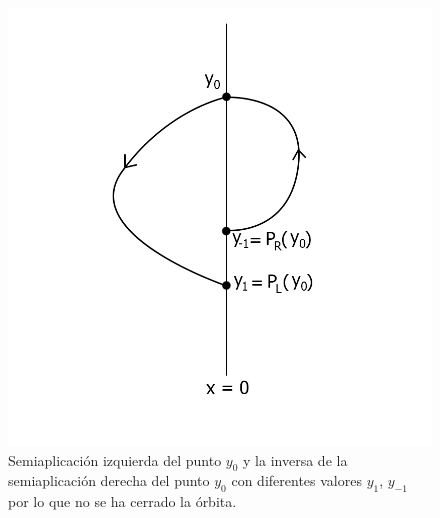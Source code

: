 \documentclass[12pt,a4paper]{report} %
\begin{document}
	\begin{figure}[h]
		\centering
		\includegraphics[width=1.1\textwidth,center]{aplipoincareL-R.jpg}
		\caption{Semiaplicación izquierda del punto $y_0$ y la inversa de la semiaplicación derecha del punto $y_0$ con diferentes valores $y_1$, $y_{-1}$ por lo que no se ha cerrado la órbita.}
		\label{fig:aplipoincareL-R}
	\end{figure}
	
	\newpage
	
\end{document}
